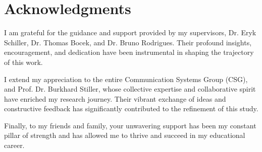 \chapter*{Acknowledgments}
I am grateful for the guidance and support provided by my supervisors, Dr. Eryk Schiller, Dr. Thomas Bocek, and Dr. Bruno Rodrigues. Their profound insights, encouragement, and dedication have been instrumental in shaping the trajectory of this work.

I extend my appreciation to the entire Communication Systems Group (CSG), and Prof. Dr. Burkhard Stiller, whose collective expertise and collaborative spirit have enriched my research journey. Their vibrant exchange of ideas and constructive feedback has significantly contributed to the refinement of this study.

Finally, to my friends and family, your unwavering support has been my constant pillar of strength and has allowed me to thrive and succeed in my educational career.